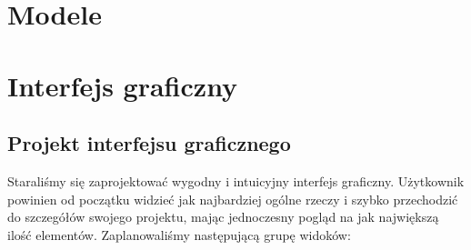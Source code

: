 \documentclass[a4paper,12pt,notitlepage]{mwrep}
\begin{document}
\section{Modele}

\section{Interfejs graficzny}

\subsection{Projekt interfejsu graficznego}
Staraliśmy się zaprojektować wygodny i intuicyjny interfejs graficzny. Użytkownik powinien od początku widzieć jak 
najbardziej ogólne rzeczy i szybko przechodzić do szczegółów swojego projektu, mając jednoczesny pogląd na jak 
największą ilość elementów. Zaplanowaliśmy następującą grupę widoków:
\end{document}

